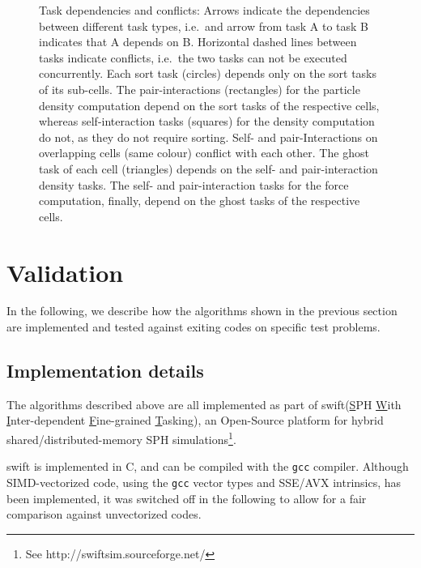 \documentclass[a4paper,conference]{IEEEtran}
\newcommand{\swift}
    {{\sc swift}\xspace}
\begin{document}
\begin{figure}
    \centerline{}
    
    \caption{Task dependencies and conflicts:
        Arrows indicate the dependencies
        between different task types, i.e.~and arrow from task A to task
        B indicates that A depends on B.
        Horizontal dashed lines between tasks indicate conflicts,
        i.e.~the two tasks can not be executed concurrently.
        Each sort task (circles) depends
        only on the sort tasks of its sub-cells.
        The pair-interactions (rectangles) for the particle
        density computation depend on the sort tasks of the respective cells,
        whereas self-interaction tasks (squares) for the density computation
        do not, as they do not require sorting.
        Self- and pair-Interactions on overlapping cells (same colour)
        conflict with each other.
        The ghost task of each cell (triangles) depends on the self-
        and pair-interaction density tasks.
        The self- and pair-interaction tasks for the force computation,
        finally, depend on the ghost tasks of the respective cells.
        }
    \label{fig:Hierarchy2}
\end{figure}


\section{Validation}

In the following, we describe how the algorithms shown in the previous section
are implemented and tested against exiting codes on specific test problems.

\subsection{Implementation details}

The algorithms described above are all implemented as part
of \swift (\underline{S}PH \underline{W}ith
\underline{I}nter-dependent \underline{F}ine-grained
\underline{T}asking),
an Open-Source platform for hybrid shared/distributed-memory
SPH simulations\footnote{See http://swiftsim.sourceforge.net/}.

\swift is implemented in C, and can be compiled with the
{\tt gcc} compiler.
Although SIMD-vectorized code, using the {\tt gcc} vector types
and SSE/AVX intrinsics, has been implemented, it was switched
off in the following to allow for a fair comparison against
unvectorized codes.
\end{document}
